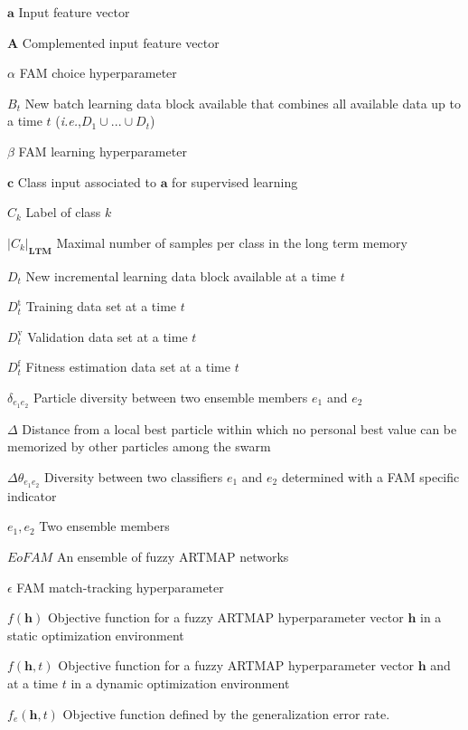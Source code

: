 \documentclass[letterpaper, twoside, 12pt,these,creativecommons,hyperref]{thETS}
\begin{document}
\begin{listofsymbols}[3cm]
\item [$\textbf{a}$] Input feature vector
\item [$\textbf{A}$] Complemented input feature vector
\item [$\alpha$] FAM choice hyperparameter
\item [$B_t$] New batch learning data block available that combines all available data up to a time $t$ (\emph{i.e.},$D_1 \cup ... \cup D_t$)
\item [$\beta$] FAM learning hyperparameter
\item [$\mathbf{c}$] Class input associated to $\textbf{a}$ for supervised learning
\item [$C_k$] Label of class $k$
\item [$|C_k|_\mathbf{LTM}$] Maximal number of samples per class in the long term memory
\item [$D_t$] New incremental learning data block available at a time $t$
\item [$D_t^\text{t}$] Training data set at a time $t$
\item [$D_t^\text{v}$] Validation data set at a time $t$
\item [$D_t^\text{f}$] Fitness estimation data set at a time $t$
\item [$\delta_{e_1e_2}$] Particle diversity between two ensemble members $e_1$ and $e_2$
\item [$\Delta$] Distance from a local best particle within which no personal best value can be memorized by other particles among the swarm
\item [$\Delta\theta_{e_1e_2}$] Diversity between two classifiers $e_1$ and $e_2$ determined with a FAM specific indicator
\item [$e_1,e_2$] Two ensemble members
\item [$\textit{EoFAM}$] An ensemble of fuzzy ARTMAP networks
\item [$\epsilon$] FAM match-tracking hyperparameter
\item [$f(\textbf{h})$] Objective function for a fuzzy ARTMAP hyperparameter vector $\textbf{h}$ in a static optimization environment
\item [$f(\textbf{h},t)$] Objective function for a fuzzy ARTMAP hyperparameter vector $\textbf{h}$ and at a time $t$ in a dynamic optimization environment
\item [$f_e(\mathbf{h},t)$] Objective function defined by the generalization error rate.

\end{listofsymbols}
\end{document}
